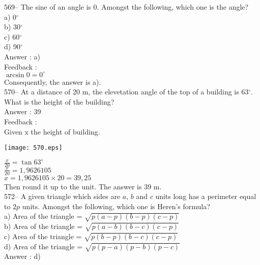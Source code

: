 \documentclass[letterpaper, 12pt]{article}
\begin{document}
569-- The sine of an angle is 0.  Amongst the following, which one is the angle?\\
a) 0$^{\circ}$\\
b) 30$^{\circ}$\\
c) 60$^{\circ}$\\
d) 90$^{\circ}$\\

Answer : a)\\

Feedback : \\
$\arcsin 0 = 0^{\circ}$\\
Consequently, the answer is a).\\

570-- At a distance of 20 m, the elevetation angle of the top of a building is 63$^{\circ}$. What is the height of the building?\\

Answer : 39  \\

Feedback : \\
Given x the height of building.\\[2mm]   \begin{center}
    \texttt{[image: 570.eps]}
    \end{center}
$\frac{x}{20}=\tan 63^{\circ}$\\[2mm]
$\frac{x}{20}=1,9626105$\\[2mm]
$x=1,9626105\times20=39,25$\\[2mm]
Then round it up to the unit.
The answer is 39 m.\\



572-- A given triangle which sides are $a$, $b$ and $c$ units long has a perimeter equal to $2p$ units. Amongst the following, which one is Heren's formula?\\
a) Area of the triangle = $\sqrt{p\left( a-p\right) \left( b-p\right) \left(
c-p\right) }$\\[2mm]
b) Area of the triangle = $\sqrt{p\left( a-b\right) \left( b-c\right) \left(
c-p\right) }$\\[2mm]
c) Area of the triangle = $\sqrt{p\left( b-p\right) \left( b-c\right) \left(
c-p\right) }$\\[2mm]
d) Area of the triangle = $\sqrt{p\left( p-a\right) \left( p-b\right) \left(
p-c\right) }$\\

Answer : d)\\
\end{document}
